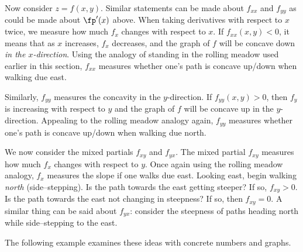 Now consider $z=f(x,y)$. Similar statements can be made about $f_{xx}$ and $f_{yy}$ as could be made about $\fp'(x)$ above. When taking derivatives with respect to $x$ twice, we measure how much $f_x$ changes with respect to $x$. If $f_{xx}(x,y)<0$, it means that as $x$ increases, $f_x$ decreases, and the graph of $f$ will be concave down \textit{in the $x$-direction}. Using the analogy of standing in the rolling meadow used earlier in this section, $f_{xx}$ measures whether one's path is concave up/down when walking due east.

Similarly, $f_{yy}$ measures the concavity in the $y$-direction. If $f_{yy}(x,y)>0$, then $f_y$ is increasing with respect to $y$ and the graph of $f$ will be concave up in the $y$-direction. Appealing to the rolling meadow analogy again, $f_{yy}$ measures whether one's path is concave up/down when walking due north.

We now consider the mixed partials $f_{xy}$ and $f_{yx}$. The mixed partial $f_{xy}$ measures how much $f_x$ changes with respect to $y$. Once again using the rolling meadow analogy, $f_{x}$ measures the slope if one walks due east. Looking east, begin walking \textit{north} (side--stepping). Is the path towards the east getting steeper? If so, $f_{xy}>0$. Is the path towards the east not changing in steepness? If so, then $f_{xy}=0$. A similar thing can be said about $f_{yx}$: consider the steepness of paths heading north while side--stepping to the east.

The following example examines these ideas with concrete numbers and graphs.

